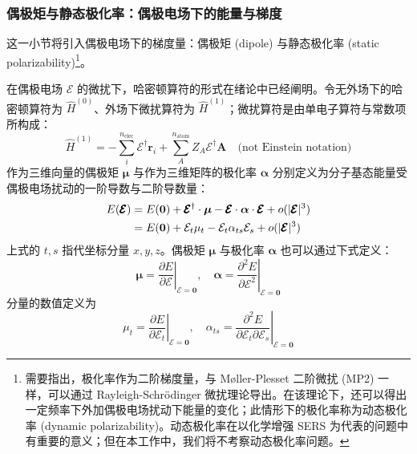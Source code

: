 \subsubsection{偶极矩与静态极化率：偶极电场下的能量与梯度}

这一小节将引入偶极电场下的梯度量：偶极矩 (dipole) 与静态极化率 (static polarizability)\footnote{需要指出，极化率作为二阶梯度量，与 M\o{}ller-Plesset 二阶微扰 (MP2) 一样，可以通过 Rayleigh-Schr\"odinger 微扰理论导出。在该理论下，还可以得出一定频率下外加偶极电场扰动下能量的变化；此情形下的极化率称为动态极化率 (dynamic polarizability)。动态极化率在以化学增强 SERS 为代表的问题中有重要的意义\cite{Perez-Jimenez-Ren.CS.2020, Li-Xu.C.2022}；但在本工作中，我们将不考察动态极化率问题。}。

在偶极电场 $\pmb{\mathcal{E}}$ 的微扰下，哈密顿算符的形式\alert{在绪论中}已经阐明。令无外场下的哈密顿算符为 $\hat H^{(0)}$、外场下微扰算符为 $\hat H^{(1)}$；微扰算符是由单电子算符与常数项所构成：
\begin{equation}
  \label{eq.electric-perturbed-hamiltonian}
  \hat H^{(1)} = - \sum_i^{n_\mathrm{elec}} \pmb{\mathcal{E}}^\dagger \bm{r}_i + \sum_{A}^{n_\mathrm{atom}} Z_A \pmb{\mathcal{E}}^\dagger \bm{A} \quad \text{(not Einstein notation)}
\end{equation}
作为三维向量的偶极矩 $\bm{\mu}$ 与作为三维矩阵的极化率 $\bm{\alpha}$ 分别定义为分子基态能量受偶极电场扰动的一阶导数与二阶导数量\cite{Atkins-Friedman.Oxford.2011}：
\begin{align}
  E(\pmb{\mathcal{E}}) &= E(\bm{0}) + \pmb{\mathcal{E}}^\dagger \cdot \bm{\mu} - \pmb{\mathcal{E}} \cdot \bm{\alpha} \cdot \pmb{\mathcal{E}} + o(|\pmb{\mathcal{E}}|^3) \notag\\
  &= E(\bm{0}) + \mathcal{E}_t \mu_t - \mathcal{E}_t \alpha_{ts} \mathcal{E}_s + o(|\pmb{\mathcal{E}}|^3)
\end{align}
上式的 $t, s$ 指代坐标分量 $x, y, z$。偶极矩 $\bm{\mu}$ 与极化率 $\bm{\alpha}$ 也可以通过下式定义：
\begin{equation}
  \bm{\mu} = \left. \frac{\partial E}{\partial \pmb{\mathcal{E}}} \right|_{\pmb{\mathcal{E}} = \bm{0}}, \quad
  \bm{\alpha} = \left. \frac{\partial^2 E}{\partial \pmb{\mathcal{E}}^2} \right|_{\pmb{\mathcal{E}} = \bm{0}}
\end{equation}
分量的数值定义为
\begin{equation}
  \mu_t = \left. \frac{\partial E}{\partial \mathcal{E}_t} \right|_{\pmb{\mathcal{E}} = \bm{0}}, \quad
  \alpha_{ts} = \left. \frac{\partial^2 E}{\partial \mathcal{E}_t \partial \mathcal{E}_s} \right|_{\pmb{\mathcal{E}} = \bm{0}}
\end{equation}


